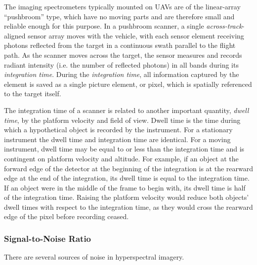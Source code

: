 The imaging spectrometers typically mounted on UAVs are of the linear-array ``pushbroom'' type, which have no moving parts and are therefore small and reliable enough for this purpose. In a pushbroom scanner, a single \emph{across-track}-aligned sensor array moves with the vehicle, with each sensor element receiving photons reflected from the target in a continuous swath parallel to the flight path. As the scanner moves across the target, the sensor measures and records radiant intensity (i.e. the number of reflected photons) in all bands during its \emph{integration time}. During the \emph{integration time}, all information captured by the element is saved as a single picture element, or pixel, which is spatially referenced to the target itself. 

The integration time of a scanner is related to another important quantity, \emph{dwell time}, by the platform velocity and field of view. Dwell time is the time during which a hypothetical object is recorded by the instrument. For a stationary instrument the dwell time and integration time are identical. For a moving instrument, dwell time may be equal to or less than the integration time and is contingent on platform velocity and altitude. For example, if an object at the forward edge of the detector at the beginning of the integration is at the rearward edge at the end of the integration, its dwell time is equal to the integration time. If an object were in the middle of the frame to begin with, its dwell time is half of the integration time. Raising the platform velocity would reduce both objects' dwell times with respect to the integration time, as they would cross the rearward edge of the pixel before recording ceased.


\subsubsection{Signal-to-Noise Ratio}

There are several sources of noise in hyperspectral imagery. 


